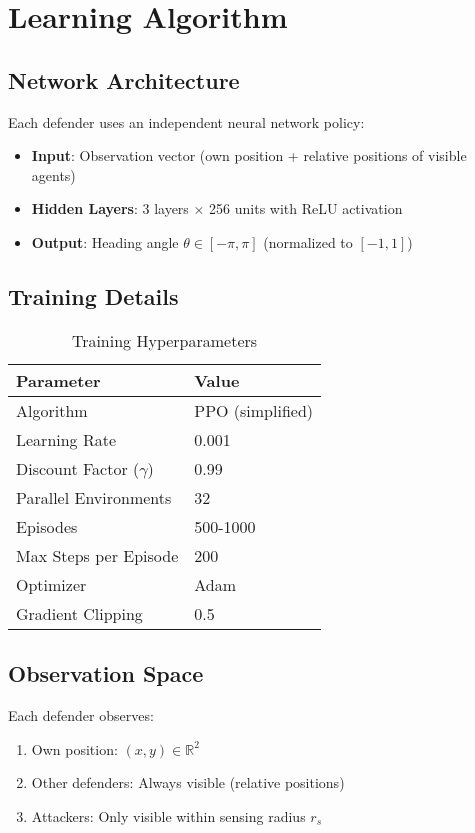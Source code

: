 \documentclass[11pt,a4paper]{article}
\begin{document}
\section{Learning Algorithm}

\subsection{Network Architecture}

Each defender uses an independent neural network policy:
\begin{itemize}
    \item \textbf{Input}: Observation vector (own position + relative positions of visible agents)
    \item \textbf{Hidden Layers}: 3 layers × 256 units with ReLU activation
    \item \textbf{Output}: Heading angle $\theta \in [-\pi, \pi]$ (normalized to $[-1, 1]$)
\end{itemize}

\subsection{Training Details}

\begin{table}[h]
\centering
\caption{Training Hyperparameters}
\begin{tabular}{ll}
\toprule
\textbf{Parameter} & \textbf{Value} \\
\midrule
Algorithm & PPO (simplified) \\
Learning Rate & 0.001 \\
Discount Factor ($\gamma$) & 0.99 \\
Parallel Environments & 32 \\
Episodes & 500-1000 \\
Max Steps per Episode & 200 \\
Optimizer & Adam \\
Gradient Clipping & 0.5 \\
\bottomrule
\end{tabular}
\end{table}

\subsection{Observation Space}

Each defender observes:
\begin{enumerate}
    \item Own position: $(x, y) \in \mathbb{R}^2$
    \item Other defenders: Always visible (relative positions)
    \item Attackers: Only visible within sensing radius $r_s$
\end{enumerate}
\end{document}
